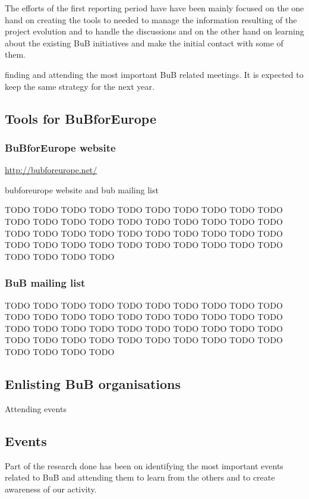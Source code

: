 The efforts of the first reporting period have have been mainly focused on the one hand on creating the tools to needed to manage the information resulting of the project evolution and to handle the discussions and on the other hand on learning about the existing BuB initiatives and make the initial contact with some of them.

finding and attending the most important BuB related meetings. It is expected to keep the same strategy for the next year.

\subsection{Tools for BuBforEurope}


\subsubsection{BuBforEurope website}


\url{http://bubforeurope.net/}

{bubforeurope website and bub mailing list}

TODO TODO TODO TODO TODO TODO TODO TODO TODO TODO TODO TODO TODO TODO TODO TODO TODO TODO TODO TODO TODO TODO TODO TODO TODO TODO TODO TODO TODO TODO TODO TODO TODO TODO TODO TODO TODO TODO TODO TODO TODO TODO TODO TODO 

\subsubsection{BuB mailing list}

TODO TODO TODO TODO TODO TODO TODO TODO TODO TODO TODO TODO TODO TODO TODO TODO TODO TODO TODO TODO TODO TODO TODO TODO TODO TODO TODO TODO TODO TODO TODO TODO TODO TODO TODO TODO TODO TODO TODO TODO TODO TODO TODO TODO 


\subsection{Enlisting BuB organisations}

Attending events

\subsection{Events}

Part of the research done has been on identifying the most important events related to BuB and attending them to learn from the others and to create awareness of our activity.

